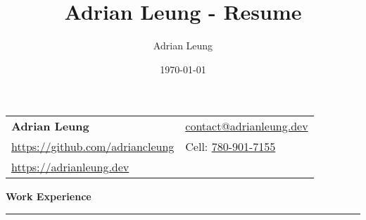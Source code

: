\documentclass[11pt]{article}
\title{Adrian Leung - Resume}
\author{Adrian Leung}
\date{\today}
\begin{document}
\begin{tabularx}{\textwidth}
  {
    >{\raggedright\arraybackslash}X
    >{\raggedleft\arraybackslash}X
  }
  \Large\textbf{Adrian Leung}                                             & \href{mailto:contact@adrianleung.dev}{contact@adrianleung.dev}   \\
  \href{https://github.com/adriancleung}{https://github.com/adriancleung} & Cell: \href{tel:7809017155}{780-901-7155}                        \\
  \href{https://adrianleung.dev}{https://adrianleung.dev}                 &                                                                  \\
\end{tabularx}
\vspace{-15pt}

\begin{center}
  \textbf{Work Experience}
  \noindent\rule[10pt]{0.9\paperwidth}{0.4pt}
\end{center}
\vspace{-20pt}
\end{document}
